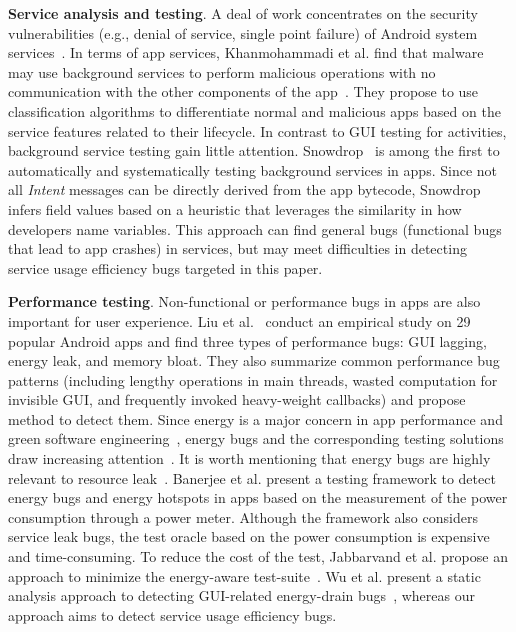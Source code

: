 \documentclass[sigconf,review, anonymous]{acmart}
\begin{document}
\textbf{Service analysis and testing}. A deal of work concentrates on the security vulnerabilities (e.g., denial of service, single point failure) of Android system services~\cite{ReavesBGABCDHKS16,HuangZ0015,WangZL16,FengS16,AbualolaAKOM16,LuoZCCLLGYXL17}.
In terms of app services, Khanmohammadi et al. find that malware may use background services to perform malicious operations with no communication with the other components of the app~\cite{KhRH15}. They propose to use classification algorithms to differentiate normal and malicious apps based on the service features related to their lifecycle. In contrast to GUI testing for activities, background service testing gain little attention. \textsf{Snowdrop}~\cite{ZhangLLC17} is among the first to automatically and systematically testing background services in apps. Since not all \textit{Intent} messages can be directly derived from the app bytecode, \textsf{Snowdrop} infers field values based on a heuristic that leverages the similarity in how developers name variables. This approach can find general bugs (functional bugs that lead to app crashes) in services, but may meet difficulties in detecting service usage efficiency bugs targeted in this paper.

\textbf{Performance testing}. Non-functional or performance bugs in apps are also important for user experience. Liu et al.~\cite{LiuXC14} conduct an empirical study on 29 popular Android apps and find three types of performance bugs: GUI lagging, energy leak, and memory bloat. They also summarize common performance bug patterns (including lengthy operations in main threads, wasted computation for invisible GUI, and frequently invoked heavy-weight callbacks) and propose method to detect them. Since energy is a major concern in app performance and green software engineering~\cite{PangHAH16,HoqueSKXT16,MBZSJSPC16,0036990}, energy bugs and the corresponding testing solutions draw increasing attention~\cite{GuoZYZZ13,BanerjeeC0R14,LiuXCL14,BehrouzSBM16,WuYR16,JabbarvandM17}.   It is worth mentioning that energy bugs are highly relevant to resource leak~\cite{GuoZYZZ13,BanerjeeC0R14,LiuXCL14,WuYR16}. Banerjee et al. present a testing framework to detect energy bugs and energy hotspots in apps based on the measurement of the power consumption through a power meter. Although the framework also considers service leak bugs, the test oracle based on the power consumption is expensive and time-consuming. To reduce the cost of the test, Jabbarvand et al. propose an approach to minimize the energy-aware test-suite~\cite{BehrouzSBM16}. Wu et al. present a static analysis approach to detecting GUI-related energy-drain bugs~\cite{WuYR16}, whereas our approach aims to detect service usage efficiency bugs.
\end{document}
